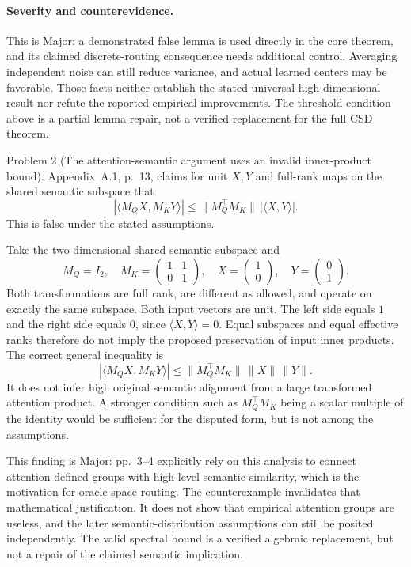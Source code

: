 \documentclass[10pt]{article}
\begin{document}
\paragraph*{Severity and counterevidence.}\mbox{}\par
This is Major: a demonstrated false lemma is used directly in the core theorem, and its claimed discrete-routing consequence needs additional control. Averaging independent noise can still reduce variance, and actual learned centers may be favorable. Those facts neither establish the stated universal high-dimensional result nor refute the reported empirical improvements. The threshold condition above is a partial lemma repair, not a verified replacement for the full CSD theorem.\par
Problem 2 (The attention-semantic argument uses an invalid inner-product bound).  Appendix A.1, p. 13, claims for unit \(X,Y\) and full-rank maps on the shared semantic subspace that \[|\langle M_QX,M_KY\rangle|
 \le \|M_Q^\top M_K\|\,|\langle X,Y\rangle|.\] This is false under the stated assumptions.\par
Take the two-dimensional shared semantic subspace and \[M_Q=I_2,\quad
 M_K=\begin{pmatrix}1&1\\0&1\end{pmatrix},\quad
 X=\begin{pmatrix}1\\0\end{pmatrix},\quad
 Y=\begin{pmatrix}0\\1\end{pmatrix}.\] Both transformations are full rank, are different as allowed, and operate on exactly the same subspace. Both input vectors are unit. The left side equals \(1\) and the right side equals \(0\), since \(\langle X,Y\rangle=0\). Equal subspaces and equal effective ranks therefore do not imply the proposed preservation of input inner products. The correct general inequality is \[|\langle M_QX,M_KY\rangle|
 \le\|M_Q^\top M_K\|\,\|X\|\,\|Y\|.\] It does not infer high original semantic alignment from a large transformed attention product. A stronger condition such as \(M_Q^\top M_K\) being a scalar multiple of the identity would be sufficient for the disputed form, but is not among the assumptions.\par
This finding is Major: pp. 3–4 explicitly rely on this analysis to connect attention-defined groups with high-level semantic similarity, which is the motivation for oracle-space routing. The counterexample invalidates that mathematical justification. It does not show that empirical attention groups are useless, and the later semantic-distribution assumptions can still be posited independently. The valid spectral bound is a verified algebraic replacement, but not a repair of the claimed semantic implication.\par
\end{document}
